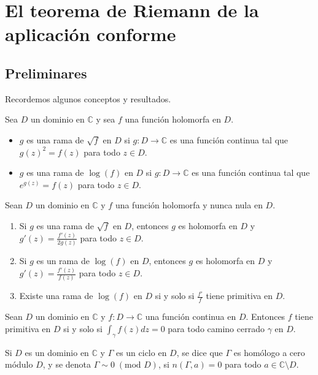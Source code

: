 \chapter{El teorema de Riemann de la aplicación conforme}

\section{Preliminares}
Recordemos algunos conceptos y resultados.

\begin{definition}
    Sea $D$ un dominio en $\mathbb{C}$ y sea $f$ una función holomorfa en $D$.
    \begin{itemize}
        \item $g$ es una rama de $\sqrt{f}$ en $D$ si $g: D \to \mathbb{C}$ es una función continua tal que $g(z)^2 = f(z)$ para todo $z \in D$.
        \item $g$ es una rama de $\log(f)$ en $D$ si $g: D \to \mathbb{C}$ es una función continua tal que $e^{g(z)} = f(z)$ para todo $z \in D$.
    \end{itemize}
\end{definition}

\begin{proposition}
    Sean $D$ un dominio en $\mathbb{C}$ y $f$ una función holomorfa y nunca nula en $D$.
    \begin{enumerate}
        \item Si $g$ es una rama de $\sqrt{f}$ en $D$, entonces $g$ es holomorfa en $D$ y $g'(z) = \frac{f'(z)}{2g(z)}$ para todo $z \in D$.
        \item Si $g$ es un rama de $\log(f)$ en $D$, entonces $g$ es holomorfa en $D$ y $g'(z) = \frac{f'(z)}{f(z)}$ para todo $z \in D$.
        \item Existe una rama de $\log(f)$ en $D$ si y solo si $\frac{f'}{f}$ tiene primitiva en $D$.
    \end{enumerate}
\end{proposition}

\begin{proposition}
    Sean $D$ un dominio en $\mathbb{C}$ y $f: D \to \mathbb{C}$ una función continua en $D$.
    Entonces $f$ tiene primitiva en $D$ si y solo si $\int_\gamma f(z)dz = 0$ para todo camino cerrado $\gamma$ en $D$.
\end{proposition}

\begin{definition}
    Si $D$ es un dominio en $\mathbb{C}$ y $\Gamma$ es un ciclo en $D$, se dice que $\Gamma$ es homólogo a cero módulo $D$, y se denota $\Gamma \sim 0 \; (\text{mod } D)$, si $n(\Gamma, a) = 0$ para todo $a \in \mathbb{C} \setminus D$.
\end{definition}

